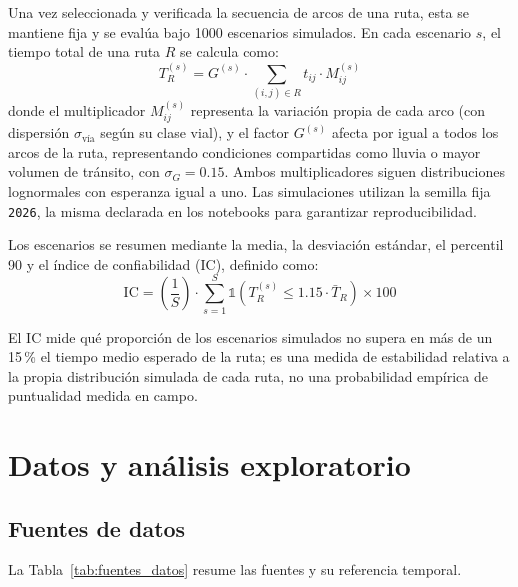 \documentclass[11pt]{article}
\numberwithin{equation}{section}
\begin{document}
Una vez seleccionada y verificada la secuencia de arcos de una ruta, esta se mantiene fija y se evalúa bajo 1000 escenarios simulados. En cada escenario $s$, el tiempo total de una ruta $R$ se calcula como:
\begin{equation}
    T_R^{(s)} = G^{(s)} \cdot \sum_{(i,j) \in R} t_{ij} \cdot M_{ij}^{(s)}
    \label{eq:montecarlo}
\end{equation}
donde el multiplicador $M_{ij}^{(s)}$ representa la variación propia de cada arco (con dispersión $\sigma_{\text{vía}}$ según su clase vial), y el factor $G^{(s)}$ afecta por igual a todos los arcos de la ruta, representando condiciones compartidas como lluvia o mayor volumen de tránsito, con $\sigma_G = 0.15$. Ambos multiplicadores siguen distribuciones lognormales con esperanza igual a uno. Las simulaciones utilizan la semilla fija \texttt{2026}, la misma declarada en los notebooks para garantizar reproducibilidad.

Los escenarios se resumen mediante la media, la desviación estándar, el percentil 90 y el índice de confiabilidad (IC), definido como:
\begin{equation}
    \mathrm{IC} = \left(\frac{1}{S}\right) \cdot \sum_{s=1}^{S} \mathbb{1}\!\left(T_R^{(s)} \leq 1.15 \cdot \bar{T}_R\right) \times 100
    \label{eq:ic}
\end{equation}

El IC mide qué proporción de los escenarios simulados no supera en más de un 15\,\% el tiempo medio esperado de la ruta; es una medida de estabilidad relativa a la propia distribución simulada de cada ruta, no una probabilidad empírica de puntualidad medida en campo.

\section{Datos y análisis exploratorio}\label{sec:datos}

\subsection{Fuentes de datos}

La Tabla~\ref{tab:fuentes_datos} resume las fuentes y su referencia temporal.
\end{document}
